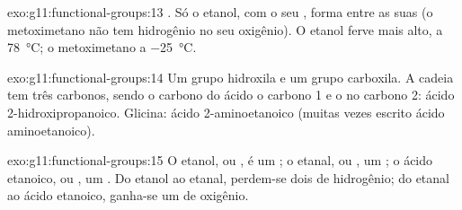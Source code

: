 \begin{solution}{exo:g11:functional-groups:13}
. Só o etanol, com o seu , forma  entre as suas  (o metoximetano não tem hidrogênio no
seu oxigênio). O etanol ferve mais alto, a \qty{78}{\celsius}; o
metoximetano a \qty{-25}{\celsius}.
\end{solution}

\begin{solution}{exo:g11:functional-groups:14}
Um grupo hidroxila e um grupo carboxila. A cadeia tem três carbonos,
sendo o carbono do ácido o carbono 1 e o  no carbono 2: ácido
2-hidroxipropanoico. Glicina: ácido 2-aminoetanoico (muitas vezes
escrito ácido aminoetanoico).
\end{solution}

\begin{solution}{exo:g11:functional-groups:15}
O etanol,  ou , é um ; o etanal,
 ou , um ; o ácido etanoico,
 ou , um . Do etanol ao etanal, perdem-se dois  de hidrogênio;
do etanal ao ácido etanoico, ganha-se um  de oxigênio.
\end{solution}

